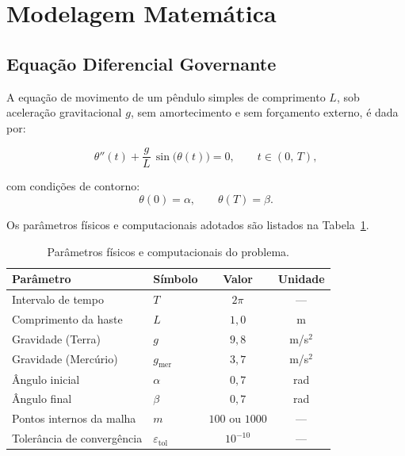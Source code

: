 \documentclass[
  12pt,
  a4paper,
  chapter=TITLE,
  section=TITLE,
  brazil,
  oneside
]{abntex2}
\begin{document}
\section{Modelagem Matemática}

\subsection{Equação Diferencial Governante}

A equação de movimento de um pêndulo simples de comprimento $L$, sob aceleração
gravitacional $g$, sem amortecimento e sem forçamento externo, é dada por:

\begin{equation}
  \theta''(t) + \frac{g}{L}\,\sin\!\bigl(\theta(t)\bigr) = 0,
  \qquad t \in (0,\,T),
  \label{eq:governante}
\end{equation}

\noindent com condições de contorno:
\begin{equation}
  \theta(0) = \alpha, \qquad \theta(T) = \beta.
  \label{eq:contorno}
\end{equation}

Os parâmetros físicos e computacionais adotados são listados na
Tabela~\ref{tab:parametros}.

\begin{table}[H]
  \centering
  \caption{Parâmetros físicos e computacionais do problema.}
  \label{tab:parametros}
  \begin{tabular}{llcc}
    \toprule
    \textbf{Parâmetro} & \textbf{Símbolo} & \textbf{Valor} & \textbf{Unidade} \\
    \midrule
    Intervalo de tempo        & $T$      & $2\pi$  & ---      \\
    Comprimento da haste      & $L$      & $1{,}0$ & m        \\
    Gravidade (Terra)         & $g$      & $9{,}8$ & m/s$^2$  \\
    Gravidade (Mercúrio)      & $g_\text{mer}$ & $3{,}7$ & m/s$^2$  \\
    Ângulo inicial            & $\alpha$ & $0{,}7$ & rad      \\
    Ângulo final              & $\beta$  & $0{,}7$ & rad      \\
    Pontos internos da malha  & $m$      & $100$ ou $1000$ & ---  \\
    Tolerância de convergência & $\varepsilon_\text{tol}$ & $10^{-10}$ & --- \\
    \bottomrule
  \end{tabular}
\end{table}
\end{document}
